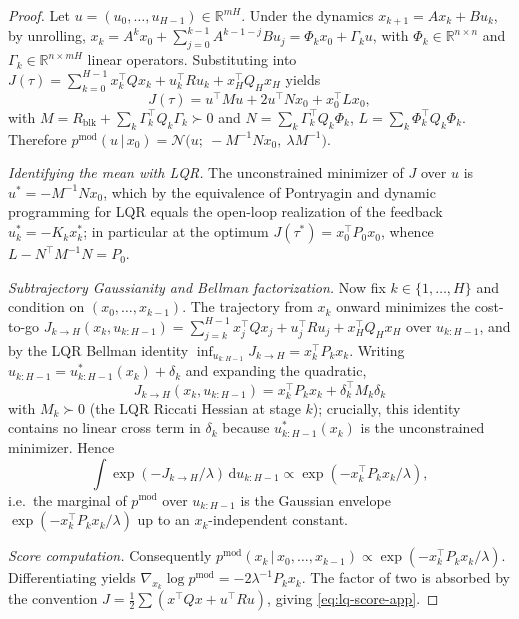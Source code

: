 \documentclass[11pt,letterpaper]{article}
\theoremstyle{plain}
\theoremstyle{definition}
\theoremstyle{remark}
\newcommand{\R}{\mathbb{R}}
\newcommand{\dd}{\mathrm{d}}
\newcommand{\calN}{\mathcal{N}}
\newcommand{\grad}{\nabla}
\begin{document}
\begin{proof}
Let $u=(u_0,\dots,u_{H-1})\in\R^{mH}$. Under the dynamics
$x_{k+1}=Ax_k+Bu_k$, by unrolling,
$x_k=A^kx_0+\sum_{j=0}^{k-1}A^{k-1-j}Bu_j=\Phi_k x_0+\Gamma_k u$,
with $\Phi_k\in\R^{n\times n}$ and $\Gamma_k\in\R^{n\times mH}$ linear
operators. Substituting into
$J(\tau)=\sum_{k=0}^{H-1}x_k^\top Qx_k+u_k^\top Ru_k+x_H^\top Q_H x_H$ yields
\begin{equation}
  J(\tau)=u^\top M u+2u^\top N x_0+x_0^\top L x_0,
  \label{eq:Juu}
\end{equation}
with $M=R_{\mathrm{blk}}+\sum_k\Gamma_k^\top Q_k\Gamma_k\succ 0$
and $N=\sum_k\Gamma_k^\top Q_k\Phi_k$, $L=\sum_k\Phi_k^\top Q_k\Phi_k$.
Therefore
$p^{\mathrm{mod}}(u\,|\,x_0)=\calN\bigl(u;\ -M^{-1}Nx_0,\ \lambda M^{-1}\bigr)$.

\emph{Identifying the mean with LQR.}
The unconstrained minimizer of $J$ over $u$ is $u^*=-M^{-1}Nx_0$, which by
the equivalence of Pontryagin and dynamic programming for LQR
equals the open-loop realization of the feedback
$u_k^*=-K_k x_k^*$; in particular at the optimum
$J(\tau^*)=x_0^\top P_0 x_0$, whence
$L-N^\top M^{-1}N=P_0$.

\emph{Subtrajectory Gaussianity and Bellman factorization.}
Now fix $k\in\{1,\dots,H\}$ and condition on $(x_0,\dots,x_{k-1})$. The
trajectory from $x_k$ onward minimizes the cost-to-go
$J_{k\to H}(x_k,u_{k:H-1})=\sum_{j=k}^{H-1}x_j^\top Q x_j+u_j^\top Ru_j+x_H^\top Q_H x_H$
over $u_{k:H-1}$, and by the LQR Bellman identity
$\inf_{u_{k:H-1}}J_{k\to H}=x_k^\top P_k x_k$. Writing
$u_{k:H-1}=u^*_{k:H-1}(x_k)+\delta_k$ and expanding the quadratic,
\[
  J_{k\to H}(x_k,u_{k:H-1})=x_k^\top P_k x_k+\delta_k^\top M_k\delta_k
\]
with $M_k\succ 0$ (the LQR Riccati Hessian at stage $k$); crucially, this
identity contains no linear cross term in $\delta_k$ because
$u^*_{k:H-1}(x_k)$ is the unconstrained minimizer.
Hence
\[
  \int\exp(-J_{k\to H}/\lambda)\,\dd u_{k:H-1}
   \propto\exp(-x_k^\top P_k x_k/\lambda),
\]
i.e.\ the marginal of $p^{\mathrm{mod}}$ over $u_{k:H-1}$ is the Gaussian
envelope $\exp(-x_k^\top P_k x_k/\lambda)$ up to an $x_k$-independent
constant.

\emph{Score computation.}
Consequently
$p^{\mathrm{mod}}(x_k\,|\,x_0,\dots,x_{k-1})\propto\exp(-x_k^\top P_k x_k/\lambda)$.
Differentiating
yields $\grad_{x_k}\log p^{\mathrm{mod}}=-2\lambda^{-1}P_k x_k$.
The factor of two is absorbed by the convention
$J=\tfrac12\sum(x^\top Q x+u^\top Ru)$, giving \eqref{eq:lq-score-app}.
\end{proof}
\end{document}
